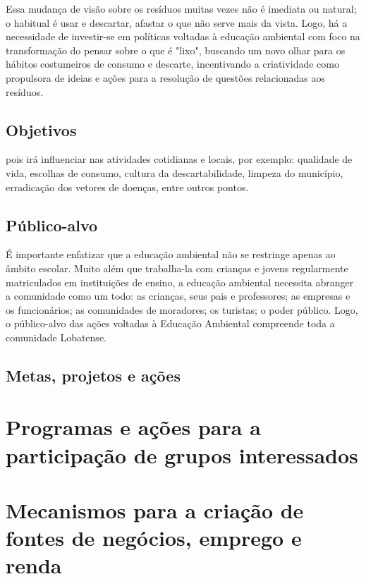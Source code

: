 Essa mudança de visão sobre os resíduos muitas vezes não é imediata ou natural; o habitual é usar e descartar, afastar o que não serve mais da vista. Logo, há a necessidade de investir-se em políticas voltadas à educação ambiental com foco na transformação do pensar sobre o que é "lixo", buscando um novo olhar para os hábitos costumeiros de consumo e descarte, incentivando a criatividade como propulsora de ideias e ações para a resolução de questões relacionadas aos resíduos. 

\subsection{Objetivos}

pois irá influenciar nas atividades cotidianas e locais, por exemplo: qualidade de vida, escolhas de consumo, cultura da descartabilidade, limpeza do município, erradicação dos vetores de doenças, entre outros pontos. 

\subsection{Público-alvo}

É importante enfatizar que a educação ambiental não se restringe apenas ao âmbito escolar. Muito além que trabalha-la com crianças e jovens regularmente matriculados em instituições de ensino, a educação ambiental necessita abranger a comunidade como um todo: as crianças, seus pais e professores; as empresas e os funcionários; as comunidades de moradores; os turistas; o poder público. Logo, o público-alvo das ações voltadas à Educação Ambiental compreende toda a comunidade Lobatense. 

\subsection{Metas, projetos e ações}

\FloatBarrier
\newpage
\section{Programas e ações para a participação de grupos interessados}
\label{sec:grup_int}

\FloatBarrier
\newpage
\section{Mecanismos para a criação de fontes de negócios, emprego e renda}
\label{sec:mec_renda}

